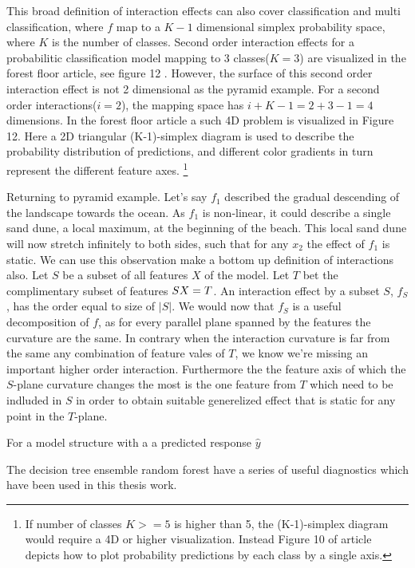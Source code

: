 This broad definition of interaction effects can also cover classification and multi classification, where $f$ map to a $K-1$ dimensional simplex probability space, where $K$ is the number of classes. Second order interaction effects for a probabilitic classification model mapping to 3 classes($K=3$) are visualized in the forest floor article, see figure 12 \cite{welling2016forest}. However, the surface of this second order interaction effect is not 2 dimensional as the pyramid example. For a second order interactions($i=2$), the mapping space has $i+K-1=2+3-1=4$ dimensions. In the forest floor article a such 4D problem is visualized in Figure 12. Here a 2D triangular (K-1)-simplex diagram is used to describe the probability distribution of predictions, and different color gradients in turn represent the different feature axes. 
\footnote{If number of classes $K>=5$ is higher than 5, the (K-1)-simplex diagram would require a 4D or higher visualization. Instead Figure 10 of article depicts how to plot probability predictions by each class by a single axis.}

Returning to pyramid example. Let's say $f_1$ described the gradual descending of the landscape towards the ocean. As $f_1$ is non-linear, it could describe a single sand dune, a local maximum, at the beginning of the beach. This local sand dune will now stretch infinitely to both sides, such that for any $x_2$ the effect of $f_1$ is static. We can use this observation make a bottom up definition of interactions also. Let $S$ be a subset of all features $X$ of the model. Let $T$ bet the complimentary subset of features $S \\ X = T$. An interaction effect by a subset $S$, $f_S$, has the order equal to size of $|S|$. We would now that $f_S$ is a useful decomposition of $f$, as for every parallel plane spanned by the features the curvature are the same. In contrary when the  interaction curvature is far from the same any combination of feature vales of $T$, we know we're missing an important higher order interaction. Furthermore the the feature axis of which the $S$-plane curvature changes the most is the one feature from $T$ which need to be indluded in $S$ in order to obtain suitable generelized effect that is static for any point in the $T$-plane.


For a model structure with a a predicted response $\hat{y}$ 

The decision tree ensemble random forest have a series of useful diagnostics which have been used in this thesis work.

\newpage


